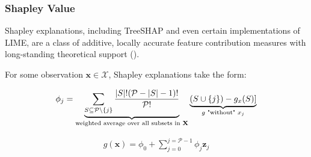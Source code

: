 \documentclass[11pt,aspectratio=169,hyperref={colorlinks}]{beamer}
\begin{document}
	\begin{frame}
	
		\frametitle{Shapley Value}	
	
		Shapley explanations, including TreeSHAP and even certain implementations of LIME, are a class of additive, locally accurate feature contribution measures with long-standing theoretical support (\cite{shapley}). 
	
		\vspace{8pt}
	
		For some observation $\mathbf{x} \in \mathcal{X}$, Shapley explanations take the form:
	
		\begin{equation}
		\label{eq:shap_contrib}
		\begin{aligned}
		\phi_{j} = \underbrace{\sum_{S \subseteq \mathcal{P} \setminus \{j\}}\frac{|S|!(\mathcal{P} -|S| -1)!}{\mathcal{P}!}}_\text{weighted average over all subsets in \textbf{X}}\underbrace{(S \cup \{j\}) - g_x(S)]}_{g\text{ "without" }x_j}
		\end{aligned}
		\end{equation}
		
		\begin{equation}
		\label{eq:shap_additive}
		\begin{aligned}
		g(\mathbf{x}) = \phi_0 + \sum_{j=0}^{j=\mathcal{P} - 1} \phi_j \mathbf{z}_j
		\end{aligned}
		\end{equation}
	
	\end{frame}
\end{document}

